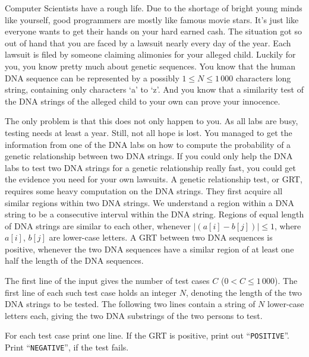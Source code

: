 Computer Scientists have a rough life.
Due to the shortage of bright young minds like yourself, good programmers are mostly like famous movie stars.
It’s just like everyone wants to get their hands on your hard earned cash.
The situation got so out of hand that you are faced by a lawsuit nearly every day of the year.
Each lawsuit is filed by someone claiming alimonies for your alleged child.
Luckily for you, you know pretty much about genetic sequences.
You know that the human DNA sequence can be represented by a possibly $1 \leq N \leq 1\,000$ characters long string, containing only characters `a' to `z'.
And you know that a similarity test of the DNA strings of the alleged child to your own can prove your innocence.

The only problem is that this does not only happen to you. As all labs are busy, testing needs at least a year.
Still, not all hope is lost.
You managed to get the information from one of the DNA labs on how to compute the probability of a genetic relationship between two DNA strings.
If you could only help the DNA labs to test two DNA strings for a genetic relationship really fast, you could get the evidence you need for your own lawsuits.
A genetic relationship test, or GRT, requires some heavy computation on the DNA strings.
They first acquire all similar regions within two DNA strings.
We understand a region within a DNA string to be a consecutive interval within the DNA string.
Regions of equal length of DNA strings are similar to each other, whenever $|(a[i] - b[j])| \leq 1$, where $a[i]$, $b[j]$ are lower-case letters.
A GRT between two DNA sequences is positive, whenever the two DNA sequences have a similar region of at least one half the length of the DNA sequences.

\begin{Input}
    The first line of the input gives the number of test cases $C$ ($0 < C \leq 1\,000$).
    The first line of each such test case holds an integer $N$, denoting the length of the two DNA strings to be tested.
    The following two lines contain a string of $N$ lower-case letters each, giving the two DNA substrings of the two persons to test.
\end{Input}

\begin{Output}
    For each test case print one line.
    If the GRT is positive, print out ``\texttt{POSITIVE}''.
    Print ``\texttt{NEGATIVE}'', if the test fails.
\end{Output}
